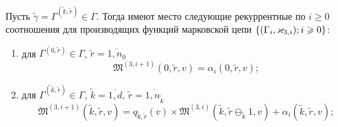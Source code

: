 \documentclass[a4paper,12pt,russian]{extarticle}
\newcommand{\MarkThree}{\{(\Gamma_i, \varkappa_{3,i}); \hm{} i \geqslant 0\}}
\begin{document}
\begin{theorem}
Пусть $\tilde{\gamma}=\Gamma^{(\tilde{k},\tilde{r})} \in \Gamma$. Тогда имеют место следующие рекуррентные по $i \geqslant 0$ соотношения для производящих функций марковской цепи $\MarkThree$:
\begin{enumerate}

\item для $ \Gamma^{(0,\tilde{r})} \in \Gamma$, $\tilde{r} = \overline{1,n_0}$ 
$$
\mathfrak{M}^{(3,i+1)}(0,\tilde{r},v) = \alpha_i(0,\tilde{r},v);
$$
\item для $\Gamma^{(\tilde{k},\tilde{r})} \in \Gamma $, $\tilde{k} =\overline{1,d}$, $\tilde{r}=\overline{1,n_{\tilde{k}}}$
$$
\mathfrak{M}^{(3,i+1)}(\tilde{k},\tilde{r},v) = q_{\tilde{k},\tilde{r}} (v)\times  \mathfrak{M}^{(3,i)}(\tilde{k},\tilde{r} \ominus_{\tilde{k}} 1,v) + \alpha_i(\tilde{k},\tilde{r},v);
$$
\end{enumerate}

\label{theorem:gen:rek}
\end{theorem}
\end{document}
